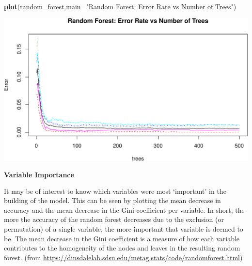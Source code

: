 \documentclass[]{article}
\newenvironment{Shaded}{\begin{snugshade}}{\end{snugshade}}
\newcommand{\KeywordTok}[1]{\textcolor[rgb]{0.13,0.29,0.53}{\textbf{{#1}}}}
\newcommand{\DataTypeTok}[1]{\textcolor[rgb]{0.13,0.29,0.53}{{#1}}}
\newcommand{\StringTok}[1]{\textcolor[rgb]{0.31,0.60,0.02}{{#1}}}
\newcommand{\NormalTok}[1]{{#1}}
\begin{document}
\begin{Shaded}
\begin{Highlighting}[]
\KeywordTok{plot}\NormalTok{(random_forest,}\DataTypeTok{main=}\StringTok{"Random Forest: Error Rate vs Number of Trees"}\NormalTok{)}
\end{Highlighting}
\end{Shaded}

\begin{center}\includegraphics{MLproject_files/figure-latex/unnamed-chunk-4-1} \end{center}

\textbf{Variable Importance}

It may be of interest to know which variables were most `important' in
the building of the model. This can be seen by plotting the mean
decrease in accuracy and the mean decrease in the Gini coefficient per
variable. In short, the more the accuracy of the random forest decreases
due to the exclusion (or permutation) of a single variable, the more
important that variable is deemed to be. The mean decrease in the Gini
coefficient is a measure of how each variable contributes to the
homogeneity of the nodes and leaves in the resulting random forest.
(from
\url{https://dinsdalelab.sdsu.edu/metag.stats/code/randomforest.html})
\end{document}
